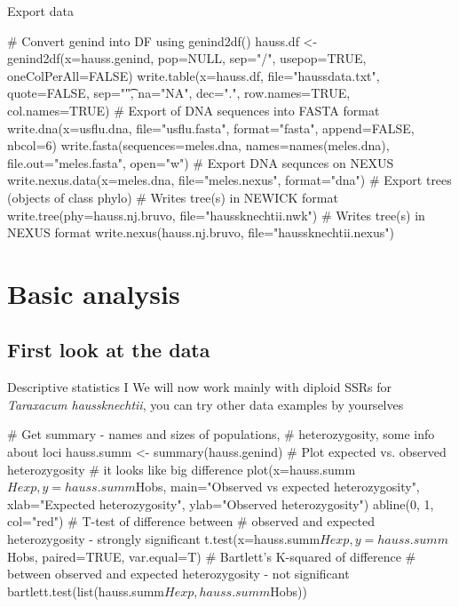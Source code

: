 \documentclass[compress, ucs, xelatex, 11pt, xcolor=svgnames,
  hyperref={
    bookmarks=true,
    unicode=true,
    colorlinks=true,
    pdftitle={Molecular data in R},
    plainpages=false,
    pdfauthor={Vojtech Zeisek},
    pdfsubject={Course about phylogeny and evolution in R},
    pdfcreator={XeLaTeX},
    pdfkeywords={R, evolution, phylogeny, molecular data},
    linkcolor=Tomato,
    anchorcolor=SaddleBrown,
    citecolor=Goldenrod,
    filecolor=DarkMagenta,
    menucolor=Sienna,
    urlcolor=DarkTurquoise,
    pdftex},
  url={hyphens, lowtilde} %
  ]{beamer}
\begin{document}
\begin{frame}[fragile]{Export data}
  \begin{spluscode}
    # Convert genind into DF using genind2df()
    hauss.df <- genind2df(x=hauss.genind, pop=NULL, sep="/",
      usepop=TRUE, oneColPerAll=FALSE)
    write.table(x=hauss.df, file="haussdata.txt", quote=FALSE,
      sep="\t", na="NA", dec=".", row.names=TRUE, col.names=TRUE)
    # Export of DNA sequences into FASTA format
    write.dna(x=usflu.dna, file="usflu.fasta", format="fasta",
      append=FALSE, nbcol=6)
    write.fasta(sequences=meles.dna, names=names(meles.dna),
      file.out="meles.fasta", open="w")
    # Export DNA sequnces on NEXUS
    write.nexus.data(x=meles.dna, file="meles.nexus", format="dna")
    # Export trees (objects of class phylo)
    # Writes tree(s) in NEWICK format
    write.tree(phy=hauss.nj.bruvo, file="haussknechtii.nwk")
    # Writes tree(s) in NEXUS format
    write.nexus(hauss.nj.bruvo, file="haussknechtii.nexus")
  \end{spluscode}
\end{frame}

\section{Basic analysis}

\subsection{First look at the data}

\begin{frame}[fragile]{Descriptive statistics I}
We will now work mainly with diploid SSRs for \textit{Taraxacum haussknechtii}, you can try other data examples by yourselves
  \begin{spluscode}
    # Get summary - names and sizes of populations,
    # heterozygosity, some info about loci
    hauss.summ <- summary(hauss.genind)
    # Plot expected vs. observed heterozygosity
    # it looks like big difference
    plot(x=hauss.summ$Hexp, y=hauss.summ$Hobs,
      main="Observed vs expected heterozygosity",
      xlab="Expected heterozygosity", ylab="Observed heterozygosity")
    abline(0, 1, col="red")
    # T-test of difference between
    # observed and expected heterozygosity - strongly significant
    t.test(x=hauss.summ$Hexp, y=hauss.summ$Hobs, paired=TRUE, var.equal=T)
    # Bartlett's K-squared of difference
    # between observed and expected heterozygosity - not significant
    bartlett.test(list(hauss.summ$Hexp,hauss.summ$Hobs))
  \end{spluscode}
\end{frame}
\end{document}
